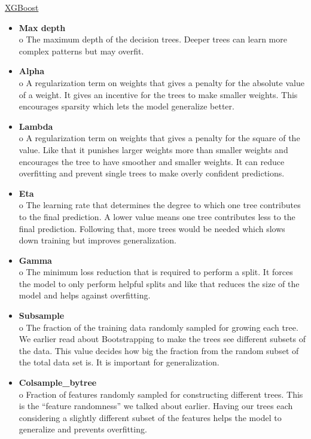 \documentclass[a4paper,12pt]{report}
\begin{document}
\begin{minipage}{\textwidth}
\underline{XGBoost}
\begin{itemize}
  \item \textbf{Max depth} \\
  o The maximum depth of the decision trees. Deeper trees can learn more complex patterns but may overfit.

  \item \textbf{Alpha} \\
  o A regularization term on weights that gives a penalty for the absolute value of a weight. It gives an incentive for the trees to make smaller weights. This encourages sparsity which lets the model generalize better.

\end{itemize}
\end{minipage}
\begin{itemize}

  \item \textbf{Lambda} \\
  o A regularization term on weights that gives a penalty for the square of the value. Like that it punishes larger weights more than smaller weights and encourages the tree to have smoother and smaller weights. It can reduce overfitting and prevent single trees to make overly confident predictions.

  \item \textbf{Eta} \\
  o The learning rate that determines the degree to which one tree contributes to the final prediction. A lower value means one tree contributes less to the final prediction. Following that, more trees would be needed which slows down training but improves generalization.

  \item \textbf{Gamma} \\
  o The minimum loss reduction that is required to perform a split. It forces the model to only perform helpful splits and like that reduces the size of the model and helps against overfitting.

  \item \textbf{Subsample} \\
  o The fraction of the training data randomly sampled for growing each tree. We earlier read about Bootstrapping to make the trees see different subsets of the data. This value decides how big the fraction from the random subset of the total data set is. It is important for generalization.

  \item \textbf{Colsample\_bytree} \\
  o Fraction of features randomly sampled for constructing different trees. This is the “feature randomness” we talked about earlier. Having our trees each considering a slightly different subset of the features helps the model to generalize and prevents overfitting.
\end{itemize}
\end{document}
